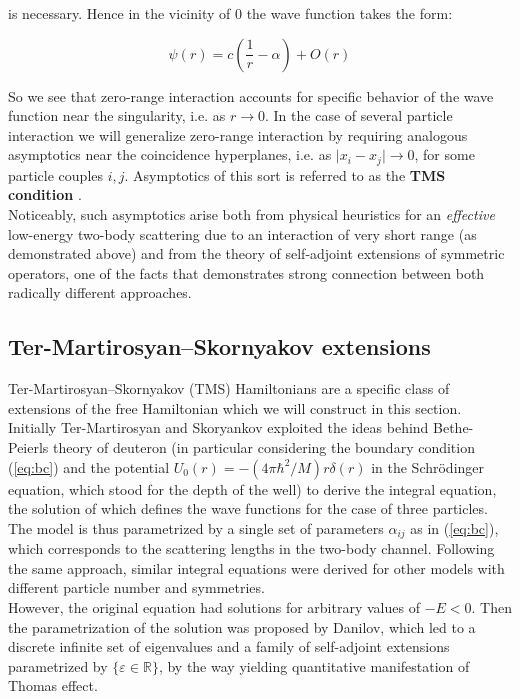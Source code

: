 \documentclass[11pt, a4paper, german]{article}
\theoremstyle{plain}
\theoremstyle{definition}
\theoremstyle{remark}
\numberwithin{equation}{section}
\numberwithin{theorem}{section}
\begin{document}
is necessary. Hence in the vicinity of 0 the wave function takes the form:

\begin{equation}
\psi(r) = c\left(\frac 1r - \alpha \right) + O(r)\label{eq:tms-condition}
\end{equation}

So we see that zero-range interaction accounts for specific behavior of the wave function near the singularity, i.e. as $r\rightarrow 0$. In the case of several particle interaction we will generalize zero-range interaction by requiring analogous asymptotics near the coincidence hyperplanes, i.e. as $\vert x_i - x_j \vert \rightarrow 0$, for some particle couples $i, j$. Asymptotics of this sort is referred to as the \textbf{TMS condition} \cite{A2}.\\

Noticeably, such asymptotics arise both from physical heuristics for an \textit{effective} low-energy two-body scattering due to an interaction of very short range (as demonstrated above) and from the theory of self-adjoint extensions of symmetric operators, one of the facts that demonstrates strong connection between both radically different approaches.\\

\subsection{Ter-Martirosyan--Skornyakov extensions}

Ter-Martirosyan--Skornyakov (TMS) Hamiltonians are a specific class of extensions of the free Hamiltonian which we will construct in this section.\\

Initially Ter-Martirosyan and Skoryankov exploited the ideas behind Bethe-Peierls theory of deuteron (in particular considering the boundary condition (\ref{eq:bc}) and the potential $U_0 (r) = -(4\pi\hbar ^2 / M)r \delta(r)$ in the Schrödinger equation, which stood for the depth of the well) to derive the integral equation, the solution of which defines the wave functions for the case of three particles. The model is thus parametrized by a single set of parameters $\alpha_{ij}$ as in (\ref{eq:bc}), which corresponds to the scattering lengths in the two-body channel. Following the same approach, similar integral equations were derived for other models with different particle number and symmetries.\\

However, the original equation had solutions for arbitrary values of $-E < 0$. Then the parametrization of the solution was proposed by Danilov, which led to a discrete infinite set of eigenvalues and a family of self-adjoint extensions parametrized by $\{\varepsilon \in \mathbb R\}$, by the way yielding quantitative manifestation of Thomas effect.\\
\end{document}
